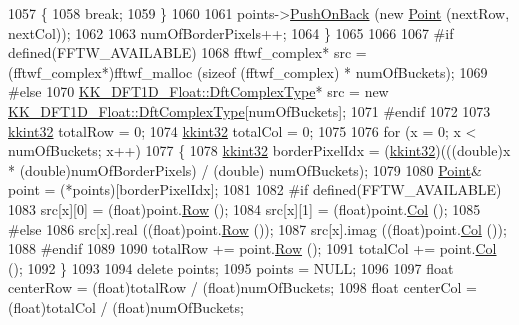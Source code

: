 \begin{DoxyCode}
1057     \{
1058       \textcolor{keywordflow}{break};
1059     \}
1060  
1061     points->\hyperlink{class_k_k_b_1_1_k_k_queue_aa9fba4632b54268bf71ecb42dee0b575}{PushOnBack} (\textcolor{keyword}{new} \hyperlink{class_k_k_b_1_1_point}{Point} (nextRow, nextCol));
1062 
1063     numOfBorderPixels++;
1064   \}
1065 
1066 
1067 \textcolor{preprocessor}{  #if  defined(FFTW\_AVAILABLE)}
1068     fftwf\_complex*  src = (fftwf\_complex*)fftwf\_malloc (\textcolor{keyword}{sizeof} (fftwf\_complex) * numOfBuckets);
1069 \textcolor{preprocessor}{  #else}
1070     \hyperlink{class_k_k_b_1_1_k_k___d_f_t1_d_a4cbc827157dd30ddec2d3753e552a827}{KK\_DFT1D\_Float::DftComplexType}*  src = \textcolor{keyword}{new} 
      \hyperlink{class_k_k_b_1_1_k_k___d_f_t1_d_a4cbc827157dd30ddec2d3753e552a827}{KK\_DFT1D\_Float::DftComplexType}[numOfBuckets];
1071 \textcolor{preprocessor}{  #endif}
1072 
1073   \hyperlink{namespace_k_k_b_a8fa4952cc84fda1de4bec1fbdd8d5b1b}{kkint32}  totalRow = 0;
1074   \hyperlink{namespace_k_k_b_a8fa4952cc84fda1de4bec1fbdd8d5b1b}{kkint32}  totalCol = 0;
1075 
1076   \textcolor{keywordflow}{for}  (x = 0;  x < numOfBuckets;  x++)
1077   \{
1078     \hyperlink{namespace_k_k_b_a8fa4952cc84fda1de4bec1fbdd8d5b1b}{kkint32}  borderPixelIdx = (\hyperlink{namespace_k_k_b_a8fa4952cc84fda1de4bec1fbdd8d5b1b}{kkint32})(((\textcolor{keywordtype}{double})x * (double)numOfBorderPixels) /  (double)
      numOfBuckets);
1079 
1080     \hyperlink{class_k_k_b_1_1_point}{Point}&  point = (*points)[borderPixelIdx];
1081 
1082 \textcolor{preprocessor}{    #if  defined(FFTW\_AVAILABLE)}
1083       src[x][0] = (float)point.\hyperlink{class_k_k_b_1_1_point_abfc34bcf809fc9fb95baf5c745b07549}{Row} ();
1084       src[x][1] = (float)point.\hyperlink{class_k_k_b_1_1_point_afb196b03757fc697f6ade0129a1c7fcf}{Col} ();
1085 \textcolor{preprocessor}{    #else}
1086       src[x].real ((\textcolor{keywordtype}{float})point.\hyperlink{class_k_k_b_1_1_point_abfc34bcf809fc9fb95baf5c745b07549}{Row} ());
1087       src[x].imag ((\textcolor{keywordtype}{float})point.\hyperlink{class_k_k_b_1_1_point_afb196b03757fc697f6ade0129a1c7fcf}{Col} ());
1088 \textcolor{preprocessor}{    #endif}
1089 
1090     totalRow += point.\hyperlink{class_k_k_b_1_1_point_abfc34bcf809fc9fb95baf5c745b07549}{Row} ();
1091     totalCol += point.\hyperlink{class_k_k_b_1_1_point_afb196b03757fc697f6ade0129a1c7fcf}{Col} ();
1092   \}
1093 
1094   \textcolor{keyword}{delete}  points;
1095   points = NULL;
1096 
1097   \textcolor{keywordtype}{float}  centerRow = (float)totalRow / (\textcolor{keywordtype}{float})numOfBuckets;
1098   \textcolor{keywordtype}{float}  centerCol = (float)totalCol / (\textcolor{keywordtype}{float})numOfBuckets;

\end{DoxyCode}
